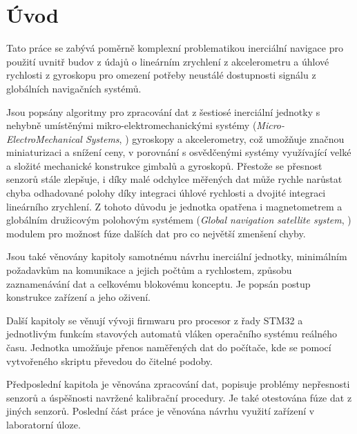 \chapter*{Úvod}
{}

Tato práce se zabývá poměrně komplexní problematikou inerciální navigace pro použití uvnitř budov z údajů o lineárním zrychlení z akcelerometru a úhlové rychlosti z gyroskopu pro omezení potřeby neustálé dostupnosti signálu z globálních navigačních systémů.

Jsou popsány algoritmy pro zpracování dat z šestiosé inerciální jednotky s nehybně umístěnými mikro-elektromechanickými systémy (\emph{Micro-ElectroMechanical Systems}, ) gyroskopy a akcelerometry, což umožňuje značnou miniaturizaci a snížení ceny, v porovnání s osvědčenými systémy využívající velké a složité mechanické konstrukce gimbalů a gyroskopů. Přestože se přesnost senzorů stále zlepšuje, i díky malé odchylce měřených dat může rychle narůstat chyba odhadované polohy díky integraci úhlové rychlosti a dvojité integraci lineárního zrychlení. Z tohoto důvodu je jednotka opatřena i magnetometrem a globálním družicovým polohovým systémem (\emph{Global navigation satellite system}, ) modulem pro možnost fúze dalších dat pro co největší zmenšení chyby.

Jsou také věnovány kapitoly samotnému návrhu inerciální jednotky, minimálním požadavkům na komunikace a jejich počtům a rychlostem, způsobu zaznamenávání dat a celkovému blokovému konceptu. Je popsán postup konstrukce zařízení a jeho oživení.

Další kapitoly se věnují vývoji firmwaru pro procesor z řady STM32 a jednotlivým funkcím stavových automatů vláken operačního systému reálného času. Jednotka umožňuje přenos naměřených dat do počítače, kde se pomocí vytvořeného skriptu převedou do čitelné podoby.

Předposlední kapitola je věnována zpracování dat, popisuje problémy nepřesnosti senzorů a úspěšnosti navržené kalibrační procedury. Je také otestována fúze dat z jiných senzorů. Poslední část práce je věnována návrhu využití zařízení v laboratorní úloze.